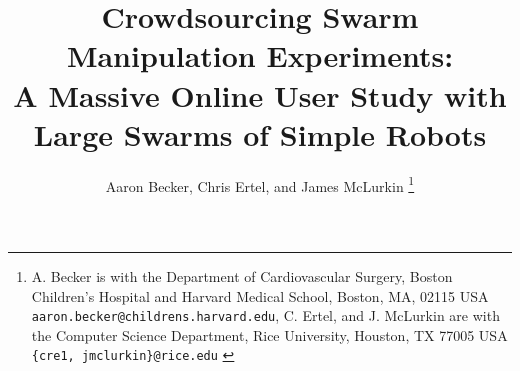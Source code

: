 \documentclass[letterpaper, 10 pt, conference]{ieeeconf}
\begin{document}


\title{\LARGE \bf 
Crowdsourcing Swarm Manipulation Experiments:\\
A Massive Online User Study with Large Swarms of Simple Robots
}
\author{Aaron Becker, Chris Ertel, and James McLurkin%
\thanks{{A. Becker  is with the Department of Cardiovascular Surgery,  Boston Children's Hospital and Harvard Medical School, Boston, MA, 02115 USA {\tt\small aaron.becker@childrens.harvard.edu}, C. Ertel, and J. McLurkin are with the Computer Science Department, Rice University, Houston, TX 77005 USA  {\tt\small  \{cre1, jmclurkin\}@rice.edu}
}
} %
} %
\maketitle
\end{document}
